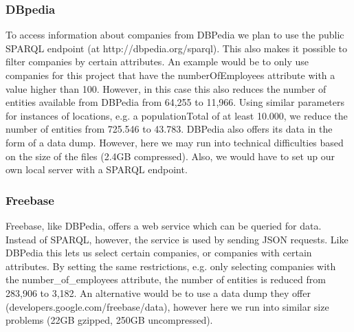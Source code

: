 \subsubsection{DBpedia}
To access information about companies from DBPedia we plan to use the public SPARQL endpoint (at http://dbpedia.org/sparql). This also makes it possible to filter companies by certain attributes. An example would be to only use companies for this project that have the numberOfEmployees attribute with a value higher than 100. However, in this case this also reduces the number of entities available from DBPedia from 64,255 to 11,966. Using similar parameters for instances of locations, e.g. a populationTotal of at least 10.000, we reduce the number of entities from 725.546 to 43.783.
DBPedia also offers its data in the form of a data dump. However, here we may run into technical difficulties based on the size of the files (2.4GB compressed). Also, we would have to set up our own local server with a SPARQL endpoint.
\subsubsection{Freebase}
Freebase, like DBPedia, offers a web service which can be queried for data. Instead of SPARQL, however, the service is used by sending JSON requests. Like DBPedia this lets us select certain companies, or companies with certain attributes. By setting the same restrictions, e.g. only selecting companies with the number\_of\_employees attribute, the number of entities is reduced from 283,906 to 3,182.
An alternative would be to use a data dump they offer (developers.google.com/freebase/data), however here we run into similar size problems (22GB gzipped, 250GB uncompressed).